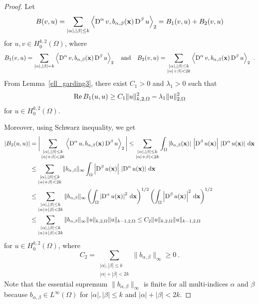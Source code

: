 \begin{proof}
Let
\[
B(v,u) = \sum_{|\alpha|,|\beta|\leq k}
\left\langle{\operatorname{D}^\alpha v} , {b_{\alpha,\beta}(\mathbf{x}) \operatorname{D}^\beta u}\right\rangle_2 
= B_1(v,u) + B_2(v,u)
\]
for $\displaystyle u, v \in H^{k,2}_0(\Omega)$, where
\[
B_1(v,u) = \sum_{|\alpha|,|\beta|= k}
\ps{\diff^\alpha v}{b_{\alpha,\beta}(\VEC{x}) \diff^\beta u}_2
\quad \text{and} \quad
B_2(v,u) = \sum_{\substack{|\alpha|,|\beta|\leq k\\|\alpha|+\beta|<2k}}
\ps{\diff^\alpha v}{b_{\alpha,\beta}(\VEC{x}) \diff^\beta u}_2 \ .
\]
From Lemma~\ref{ell_garding3}, there exist $C_1>0$ and $\lambda_1 >0$
such that
\begin{equation} \label{ell_garding_idx6}
\operatorname{Re} B_1(u,u) \geq C_1\|u\|_{k,2,\Omega}^2 - \lambda_1 \|u\|_{2,\Omega}^2
\end{equation}
for $\displaystyle u \in H^{k,2}_0(\Omega)$.

Moreover, using Schwarz inequality, we get
\begin{align}
\left| B_2(u,u) \right|
&= \bigg| \sum_{\substack{|\alpha|,|\beta|\leq k\\|\alpha|+\beta|<2k}}
\left\langle{\operatorname{D}^\alpha u} , {b_{\alpha,\beta}(\mathbf{x}) \operatorname{D}^\beta u}\right\rangle_2 \bigg|
\leq \sum_{\substack{|\alpha|,|\beta|\leq k\\|\alpha|+\beta|<2k}}
\int_{\Omega} \left| b_{\alpha,\beta}(\mathbf{x})\right|\,
\left| \operatorname{D}^\beta u(\mathbf{x}) \right| \,
\left| \operatorname{D}^\alpha u(\mathbf{x}) \right| \,\mathrm{d}{\mathbf{x}} \nonumber \\
&\leq \sum_{\substack{|\alpha|,|\beta|\leq k\\|\alpha|+\beta|<2k}}
\| b_{\alpha,\beta} \|_{\infty}
\int_{\Omega} \left| \operatorname{D}^\beta u(\mathbf{x}) \right| \,
\left| \operatorname{D}^\alpha u(\mathbf{x}) \right| \,\mathrm{d}{\mathbf{x}} \nonumber \\
&\leq \sum_{\substack{|\alpha|,|\beta|\leq k\\|\alpha|+|\beta|<2k}}
\| b_{\alpha,\beta} \|_{\infty}
\left( \int_\Omega \left| \operatorname{D}^\alpha u(\mathbf{x}) \right|^2
\,\mathrm{d}{\mathbf{x}}\right)^{1/2}
\left( \int_\Omega \left| \operatorname{D}^\beta u(\mathbf{x}) \right|^2 \,\mathrm{d}{\mathbf{x}}
\right)^{1/2} \nonumber \\
&\leq \sum_{\substack{|\alpha|,|\beta|\leq k\\|\alpha|+|\beta|<2k}}
\| b_{\alpha,\beta} \|_{\infty}
\|u\|_{k,2,\Omega} \|u\|_{k-1,2,\Omega} \leq C_2 \|u\|_{k,2,\Omega}
\|u\|_{k-1,2,\Omega} \label{ell_garding_idx8}
\end{align}
for $\displaystyle u \in H^{k,2}_0(\Omega)$, where
\[
C_2 = \sum_{\substack{|\alpha|,|\beta|\leq k\\|\alpha|+|\beta|<2k}}
\| b_{\alpha,\beta} \|_{\infty} \geq 0 \ .
\]
Note that the essential supremum
$\displaystyle \| b_{\alpha,\beta} \|_{\infty}$ is finite
for all multi-indices $\alpha$ and $\beta$ because
$b_{\alpha,\beta} \in L^\infty(\Omega)$ for $|\alpha|,|\beta|\leq k$
and $|\alpha|+|\beta|<2k$.


\end{proof}
